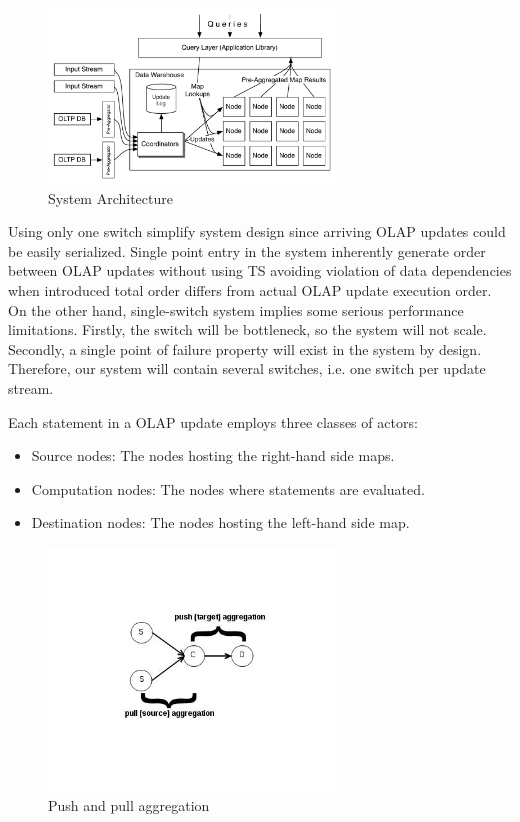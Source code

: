 \documentclass{sig-semester}
\def\OLAP{OLAP\xspace}
\def\EXORD{actual OLAP update execution order\xspace}
\begin{document}
\begin{figure}
\includegraphics[width=3in]{Architecture.pdf}
\vspace{-3mm}
\caption{System Architecture}
\label{fig:architecture}
\vspace{-2mm}
\end{figure}

Using only one switch simplify system design since arriving \OLAP updates could be easily serialized. Single point entry in the system inherently generate order between \OLAP updates without using TS avoiding violation of data dependencies when introduced total order differs from \EXORD. On the other hand, single-switch system implies some serious performance limitations. Firstly, the switch will be bottleneck, so the system will not scale. Secondly, a single point of failure property will exist in the system by design. Therefore, our system will contain several switches, i.e. one switch per update stream.

Each statement in a \OLAP update employs three classes of actors:
\begin{itemize}
 \item Source nodes: The nodes hosting the right-hand side maps.
 \item Computation nodes: The nodes where statements are evaluated.
 \item Destination nodes: The nodes hosting the left-hand side map.
\end{itemize}

\begin{figure}
\begin{center}
\includegraphics[width=3in]{pushPull.jpg}
\vspace{-21mm}
\caption{Push and pull aggregation}
\label{fig:pushPull}
\vspace{-6mm}
\end{center}
\end{figure}
\end{document}
